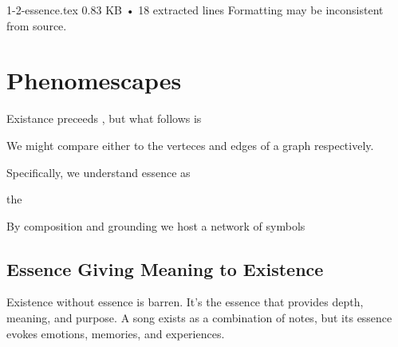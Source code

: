 1-2-essence.tex
0.83 KB • 18 extracted lines
Formatting may be inconsistent from source.
\section{Phenomescapes}

Existance preceeds , but what follows is

We might compare either to the verteces and edges of a graph respectively.

Specifically, we understand essence as

the 

By composition and grounding we host a network of symbols





\subsection{Essence Giving Meaning to Existence}
Existence without essence is barren. It's the essence that provides depth, meaning, and purpose. A song exists as a combination of notes, but its essence evokes emotions, memories, and experiences.
